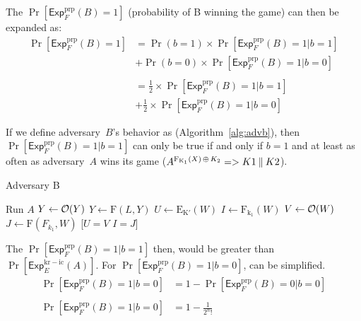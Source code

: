 \documentclass[11pt]{article}
\newcommand{\ExpPRP}[2]{\mathsf{Exp}^{\mathrm{prp}}_{#1}{(#2)}}
\newcommand{\ExpKR}[2]{\mathsf{Exp}^{\mathrm{kr-ic}}_{#1}{(#2)}}
\begin{document}

The $\Pr[\ExpPRP{F}{B} = 1]$ (probability of B winning the game) can then be expanded as:
\begin{equation}
  \begin{aligned}
  \Pr[\ExpPRP{F}{B} = 1] 
                        & = \Pr(b = 1) \times \Pr[\ExpPRP{F}{B} = 1 \vert b = 1]  \\
                        & + \Pr(b = 0) \times \Pr[\ExpPRP{F}{B} = 1 \vert b = 0] \\
                        \\
                        & = \frac{1}{2} \times \Pr[\ExpPRP{F}{B} = 1 \vert b = 1]  \\
                        & + \frac{1}{2} \times \Pr[\ExpPRP{F}{B} = 1 \vert b = 0] 
  \end{aligned}
\end{equation}




If we define adversary~$B$'s behavior as (Algorithm~\ref{alg:advb}),
then $\Pr[\ExpPRP{F}{B} = 1 \vert b = 1]$ can only be true if and only if $b = 1$ and at least as often as 
adversary~$A$ wins its game ($A^{\mathrm{F_{K_1}}(X) {\,\oplus\,} K_2} => K1 \:\|\: K2$).




\algrenewcommand{}
\begin{algorithm}{}
  \caption{Adversary B}\label{alg:advb}
\begin{algorithmic}[1]
  \State{} Run $A$
    \State{} $Y \gets {\cal O}(Y)$
  \EndIf{}
    \State{} $Y \gets \mathrm{F}(L,Y)$
  \EndIf{}
      \State{} $U \gets \mathrm{E_{K'}}(W)$
      \State{} $I \gets \mathrm{F_{k_1}}(W)$
      \State{} $V \gets {\cal O}(W)$
      \State{} $J \gets \mathrm{F}(F_{k_1}, W)$
      \State{} \Return{} [$U = V$ \AND{} $I = J$]
    \EndFor{}
  \EndIf{}
  
\end{algorithmic}
\end{algorithm}




The $\Pr[\ExpPRP{F}{B} = 1 \vert b = 1]$ then, would be greater than $\Pr[\ExpKR{E}{A}]$.
For $\Pr[\ExpPRP{F}{B} = 1 \vert b = 0]$, can be simplified.
\begin{equation}
  \begin{aligned}
    \Pr[\ExpPRP{F}{B} = 1 \vert b = 0] 
                                    & = 1 - \Pr[\ExpPRP{F}{B} = 0 \vert b = 0] \\
                                    \\
    \Pr[\ExpPRP{F}{B} = 1 \vert b = 0] & = 1 - \frac{1}{2^{n}!}
  \end{aligned}
\end{equation}
\end{document}
